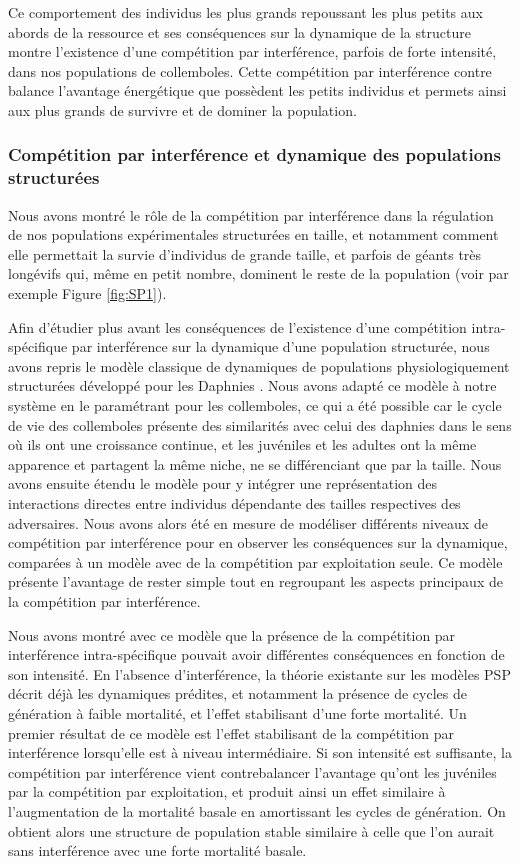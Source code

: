 Ce comportement des individus les plus grands repoussant les plus petits aux
abords de la ressource et ses conséquences sur la dynamique de la structure
montre l'existence d'une compétition par interférence, parfois de forte
intensité, dans nos populations de collemboles. Cette compétition par
interférence contre balance l'avantage énergétique que possèdent les petits
individus et permets ainsi aux plus grands de survivre et de dominer la
population.

\subsubsection{Compétition par interférence et dynamique des populations
structurées}

Nous avons montré le rôle de la compétition par interférence dans la régulation
de nos populations expérimentales structurées en taille, et notamment comment
elle permettait la survie d'individus de grande taille, et parfois de géants
très longévifs qui, même en petit nombre, dominent le reste de la population
(voir par exemple Figure \ref{fig:SP1}).

Afin d'étudier plus avant les conséquences de l'existence d'une compétition
intra-spécifique par interférence sur la dynamique d'une population structurée,
nous avons repris le modèle classique de dynamiques de populations
physiologiquement structurées développé pour les Daphnies
\autocites{kooijman1984a}. Nous avons adapté ce modèle à notre système en le
paramétrant pour les collemboles, ce qui a été possible car le cycle de vie des
collemboles présente des similarités avec celui des daphnies dans le sens où ils
ont une croissance continue, et les juvéniles et les adultes ont la même
apparence et partagent la même niche, ne se différenciant que par la taille.
Nous avons ensuite étendu le modèle pour y intégrer une représentation des
interactions directes entre individus dépendante des tailles respectives des
adversaires. Nous avons alors été en mesure de modéliser différents niveaux de
compétition par interférence pour en observer les conséquences sur la dynamique,
comparées à un modèle avec de la compétition par exploitation seule. Ce modèle
présente l'avantage de rester simple tout en regroupant les aspects principaux
de la compétition par interférence.

Nous avons montré avec ce modèle que la présence de la compétition par
interférence intra-spécifique pouvait avoir différentes conséquences en fonction
de son intensité. En l'absence d'interférence, la théorie existante sur les
modèles PSP décrit déjà les dynamiques prédites, et notamment la présence de
cycles de génération à faible mortalité, et l'effet stabilisant d'une forte
mortalité. Un premier résultat de ce modèle est l'effet stabilisant de la
compétition par interférence lorsqu'elle est à niveau intermédiaire. Si son
intensité est suffisante, la compétition par interférence vient contrebalancer
l'avantage qu'ont les juvéniles par la compétition par exploitation, et produit
ainsi un effet similaire à l'augmentation de la mortalité basale en amortissant
les cycles de génération. On obtient alors une structure de population stable
similaire à celle que l'on aurait sans interférence avec une forte mortalité
basale.

